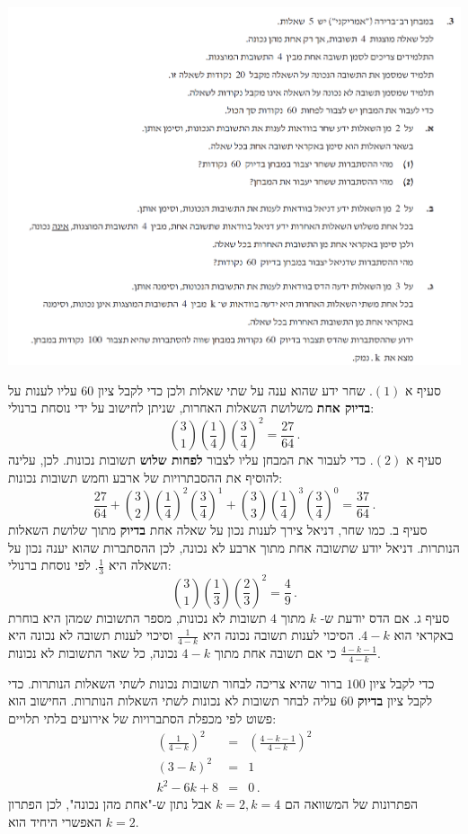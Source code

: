 \documentclass[12pt,a4paper]{article}
\begin{document}
\begin{center}
\includegraphics[width=\textwidth]{summer-2018b-3}
\end{center}

סעיף א
$(1)$.
שחר ידע שהוא ענה על שתי שאלות ולכן כדי לקבל ציון
$60$
עליו לענות על 
\textbf{בדיוק אחת}
משלושת השאלות האחרות, שניתן לחישוב על ידי נוסחת ברנולי:
\[
{3 \choose 1}\left(\frac{1}{4}\right)\left(\frac{3}{4}\right)^2=\frac{27}{64}\,.
\]
סעיף א
$(2)$.
כדי לעבור את המבחן עליו לצבור
\textbf{לפחות שלוש}
תשובות נכונות. לכן, עלינה להוסיף את ההסבתרויות של ארבע וחמש תשובות נכונות:
\[
\frac{27}{64}+{3 \choose 2}\left(\frac{1}{4}\right)^2\left(\frac{3}{4}\right)^1+{3 \choose 3}\left(\frac{1}{4}\right)^3\left(\frac{3}{4}\right)^0=\frac{37}{64}\,.
\]
סעיף ב.
כמו שחר, דניאל צירך לענות נכון על שאלה אחת 
\textbf{בדיוק}
מתוך שלושת השאלות הנותרות. דניאל יודע שתשובה אחת מתוך ארבע לא נכונה, לכן ההסתברות שהוא יענה נכון על השאלה היא
$\frac{1}{3}$.
לפי נוסחת ברנולי:
\[
{3 \choose 1}\left(\frac{1}{3}\right)\left(\frac{2}{3}\right)^2=\frac{4}{9}\,.
\]
סעיף ג. אם הדס יודעת ש-%
$k$
מתוך 
$4$
תשובות לא נכונות, מספר התשובות שמהן היא בוחרת באקראי הוא
$4-k$.
הסיכוי לענות תשובה נכונה היא
$\frac{1}{4-k}$
וסיכוי לענות תשובה לא נכונה היא
$\frac{4-k-1}{4-k}$
כי אם תשובה אחת מתוך 
$4-k$
נכונה, כל שאר התשובות לא נכונות.

כדי לקבל ציון 
$100$
ברור שהיא צריכה לבחור תשובות נכונות לשתי השאלות הנותרות. כדי לקבל ציון 
\textbf{בדיוק}
$60$
עליה לבחר תשובות לא נכונות לשתי השאלות הנותרות. החישוב הוא פשוט לפי מכפלת הסתברויות של אירועים בלתי תלויים:
\begin{eqnarray*}
\left(\frac{1}{4-k}\right)^2 &=&\left(\frac{4-k-1}{4-k}\right)^2\\
(3-k)^2&=&1\\
k^2-6k+8&=& 0\,.
\end{eqnarray*}
הפתרונות של המשוואה הם 
$k=2,k=4$
אבל נתון ש-"אחת מהן נכונה", לכן הפתרון האפשרי היחיד הוא
$k=2$.
\end{document}
